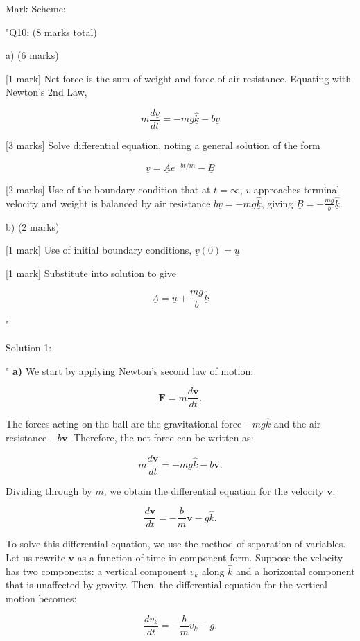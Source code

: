 Mark Scheme:

"{Q10: (8 marks total)}

a) (6 marks)

[1 mark] Net force is the sum of weight and force of air resistance. Equating with Newton’s 2nd Law, 

\[
m\frac{d\underline{v}}{dt} = - mg \hat{\underline{k}} - b\underline{v} 
\]

[3 marks] Solve differential equation, noting a general solution of the form 

\[
\underline{v} = \underline{A} e^{-bt/m} - \underline{B}
\]

[2 marks] Use of the boundary condition that at \( t = \infty \),  \( v \) approaches terminal velocity and weight is balanced by air resistance \( b\underline{v} = - mg \hat{\underline{k}} \), giving \( \underline{B} = - \frac{mg}{b} \hat{\underline{k}} \).

b) (2 marks)

[1 mark] Use of initial boundary conditions, \( \underline{v}(0) = \underline{u} \)

[1 mark] Substitute into solution to give

\[ \underline{A} = \underline{u} + \frac{mg}{b} \hat{\underline{k}} \]

"

Solution 1: 

"
\textbf{a)} We start by applying Newton's second law of motion:

\[
\mathbf{F} = m \frac{d\mathbf{v}}{dt}.
\]

The forces acting on the ball are the gravitational force $-mg\hat{k}$ and the air resistance $-b\mathbf{v}$. Therefore, the net force can be written as:

\[
m \frac{d\mathbf{v}}{dt} = -mg\hat{k} - b\mathbf{v}.
\]

Dividing through by $m$, we obtain the differential equation for the velocity $\mathbf{v}$:

\[
\frac{d\mathbf{v}}{dt} = -\frac{b}{m} \mathbf{v} - g\hat{k}.
\]

To solve this differential equation, we use the method of separation of variables. Let us rewrite $\mathbf{v}$ as a function of time in component form. Suppose the velocity has two components: a vertical component $v_k$ along $\hat{k}$ and a horizontal component that is unaffected by gravity. Then, the differential equation for the vertical motion becomes:

\[
\frac{d v_k}{dt} = -\frac{b}{m} v_k - g.
\]

